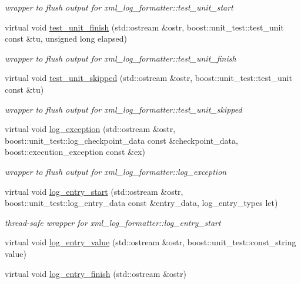 \begin{DoxyCompactItemize}
\begin{DoxyCompactList}\small\item\em wrapper to flush output for xml\-\_\-log\-\_\-formatter\-::test\-\_\-unit\-\_\-start \end{DoxyCompactList}\item 
virtual void \hyperlink{classpion_1_1test_1_1safe__xml__log__formatter_aef89506940d8bd7886f659c158e5c862}{test\-\_\-unit\-\_\-finish} (std\-::ostream \&ostr, boost\-::unit\-\_\-test\-::test\-\_\-unit const \&tu, unsigned long elapsed)
\begin{DoxyCompactList}\small\item\em wrapper to flush output for xml\-\_\-log\-\_\-formatter\-::test\-\_\-unit\-\_\-finish \end{DoxyCompactList}\item 
virtual void \hyperlink{classpion_1_1test_1_1safe__xml__log__formatter_aa838459335f68434f0ef4ee01a491caa}{test\-\_\-unit\-\_\-skipped} (std\-::ostream \&ostr, boost\-::unit\-\_\-test\-::test\-\_\-unit const \&tu)
\begin{DoxyCompactList}\small\item\em wrapper to flush output for xml\-\_\-log\-\_\-formatter\-::test\-\_\-unit\-\_\-skipped \end{DoxyCompactList}\item 
virtual void \hyperlink{classpion_1_1test_1_1safe__xml__log__formatter_a8d87cb10851f0ed9b30ddbdd5d2d7650}{log\-\_\-exception} (std\-::ostream \&ostr, boost\-::unit\-\_\-test\-::log\-\_\-checkpoint\-\_\-data const \&checkpoint\-\_\-data, boost\-::execution\-\_\-exception const \&ex)
\begin{DoxyCompactList}\small\item\em wrapper to flush output for xml\-\_\-log\-\_\-formatter\-::log\-\_\-exception \end{DoxyCompactList}\item 
virtual void \hyperlink{classpion_1_1test_1_1safe__xml__log__formatter_a50eff755ff4bc8ee87d3bdda2370faf6}{log\-\_\-entry\-\_\-start} (std\-::ostream \&ostr, boost\-::unit\-\_\-test\-::log\-\_\-entry\-\_\-data const \&entry\-\_\-data, log\-\_\-entry\-\_\-types let)
\begin{DoxyCompactList}\small\item\em thread-\/safe wrapper for xml\-\_\-log\-\_\-formatter\-::log\-\_\-entry\-\_\-start \end{DoxyCompactList}\item 
virtual void \hyperlink{classpion_1_1test_1_1safe__xml__log__formatter_a812c1c1b93592d1ab11c5273ef4eef97}{log\-\_\-entry\-\_\-value} (std\-::ostream \&ostr, boost\-::unit\-\_\-test\-::const\-\_\-string value)
\item 
virtual void \hyperlink{classpion_1_1test_1_1safe__xml__log__formatter_a9ec475531b42223043b52919ed7c440e}{log\-\_\-entry\-\_\-finish} (std\-::ostream \&ostr)
\end{DoxyCompactItemize}



